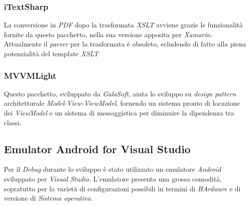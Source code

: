 \subsubsection{iTextSharp}
La conversione in \textit{PDF} dopo la trasformata \textit{XSLT} avviene grazie le funzionalità fornite da questo pacchetto, nella sua versione apposita per \textit{Xamarin}. Attualmente il \textit{parser} per la trasformata è obsoleto, ecludendo di fatto alla piena potenzialità del template \textit{XSLT}

\subsubsection{MVVMLight}
Questo pacchetto, sviluppato da \textit{GalaSoft}, aiuta lo sviluppo su \textit{design pattern} architetturale \textit{Model-View-ViewModel}, fornendo un sistema pronto di locazione dei \textit{ViewModel} e un sistema di messaggistica per diminuire la dipendenza tra classi.

\subsection{Emulator Android for Visual Studio}
Per il \textit{Debug} durante lo sviluppo è stato utilizzato un emulatore \textit{Android} sviluppato per \textit{Visual Studio}. L'emulatore presenta una grossa comodità, sopratutto per la varietà di configurazioni possibili in termini di \textit{HArdware} e di versione di \textit{Sistema operativo}.


